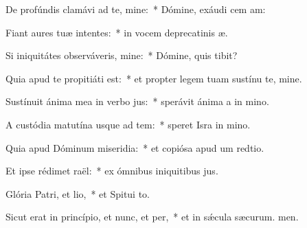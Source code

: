 \item De profúndis clamávi ad te, mine:~* Dómine, exáudi cem am:
\item Fiant aures tuæ intentes:~* in vocem deprecatinis æ.
\item Si iniquitátes observáveris, mine:~* Dómine, quis tibit?
\item Quia apud te propitiáti est:~* et propter legem tuam sustínu te, mine.
\item Sustínuit ánima mea in verbo jus:~* sperávit ánima a in mino.
\item A custódia matutína usque ad tem:~* speret Isra in mino.
\item Quia apud Dóminum miseridia:~* et copiósa apud um redtio.
\item Et ipse rédimet raël:~* ex ómnibus iniquitibus jus.
\item Glória Patri, et lio,~* et Spitui to.
\item Sicut erat in princípio, et nunc, et per,~* et in sǽcula sæcurum. men.
